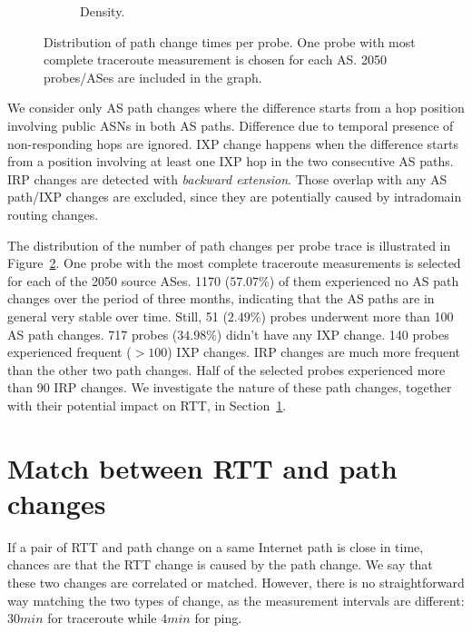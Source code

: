\begin{figure}[!htb]
\begin{subfigure}[b]{.48\textwidth}
	\caption{\footnotesize Density.}
	\label{fig:path_ch_count_density_cmp}
	\end{subfigure}
\caption{Distribution of path change times per probe. One probe with most complete traceroute measurement is chosen for each AS. 2050 probes/ASes are included in the graph.}
\label{fig:path_ch_count_cmp}
\end{figure}

We consider only AS path changes where the difference starts from a hop position involving public ASNs in both AS paths.
Difference due to temporal presence of non-responding hops are ignored.
IXP change happens when the difference starts from a position involving at least one IXP hop in the two consecutive AS paths.
IRP changes are detected with \textit{backward extension}. 
Those overlap with any AS path/IXP changes are excluded, since they are potentially caused by intradomain routing changes.

The distribution of the number of path changes per probe trace is illustrated in Figure~\ref{fig:path_ch_count_cmp}.
One probe with the most complete traceroute measurements is selected for each of the 2050 source ASes.
1170 ($57.07\%$) of them experienced no AS path changes over the period of three months, indicating that the AS paths are in general very stable over time.
Still, 51 ($2.49\%$) probes underwent more than 100 AS path changes.
717 probes ($34.98\%$) didn't have any IXP change.
140 probes experienced frequent ($> 100$) IXP changes.
IRP changes are much more frequent than the other two path changes. 
Half of the selected probes experienced more than 90 IRP changes.
We investigate the nature of these path changes, together with their potential impact on RTT, in Section~\ref{sec:corr}.

\section{Match between RTT and path changes}
\label{sec:corr}

If a pair of RTT and path change on a same Internet path is close in time, chances are that the RTT change is caused by the path change. We say that these two changes are correlated or matched. 
However, there is no straightforward way matching the two types of change, as the measurement intervals are different: $30min$ for traceroute while $4min$ for ping. 

